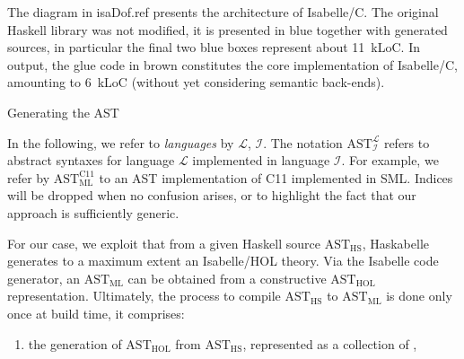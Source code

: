\begin{isabellebody}
\begin{isamarkupfigure*}
\end{isamarkupfigure*}\isamarkuptrue%
%
\begin{isamarkuptext}%
The diagram in \csname isaDof.ref presents the architecture of
Isabelle/C. The original Haskell library was not modified, it is presented in blue together with
generated sources, in particular the final two blue boxes represent about 11~kLoC. In output, the
glue code in brown constitutes the core implementation of Isabelle/C, amounting to 6~kLoC (without
yet considering semantic back-ends).%
\end{isamarkuptext}\isamarkuptrue%
%
\begin{isamarkupsubsection*}%
[label = {arch1},type = {scholarly_paper.technical}, args={label = {arch1},type = {scholarly_paper.technical}, Isa_COL.text_element.level = {}, Isa_COL.text_element.referentiable = {False}, Isa_COL.text_element.variants = {{STR ''outline'', STR ''document''}}, scholarly_paper.text_section.main_author = {}, scholarly_paper.text_section.fixme_list = {}, Isa_COL.text_element.level = {}, scholarly_paper.technical.definition_list = {}}]Generating the AST%
\end{isamarkupsubsection*}\isamarkuptrue%
%
\begin{isamarkuptext}%
In the following, we refer to \emph{languages} by $\mathcal{L}$,
$\mathcal{I}$. The notation $\text{AST}^{\mathcal{L}}_{\mathcal{I}}$ refers to abstract syntaxes for
language $\mathcal{L}$ implemented in language $\mathcal{I}$. For example, we refer by
$\text{AST}^{\text{C11}}_{\text{ML}}$ to an AST implementation of C11 implemented in SML. Indices
will be dropped when no confusion arises, or to highlight the fact that our approach is
sufficiently generic.%
\end{isamarkuptext}\isamarkuptrue%
%
\begin{isamarkuptext}%
For our case, we exploit that from a given Haskell source $\text{AST}_{\text{HS}}$,
Haskabelle generates to a maximum extent an Isabelle/HOL theory. Via the Isabelle code generator, an
$\text{AST}_{\text{ML}}$ can be obtained from a constructive $\text{AST}_{\text{HOL}}$
representation. Ultimately, the process to compile $\text{AST}_{\text{HS}}$ to $\text{AST}_{\text{ML}}$
is done only once at build time, it comprises:

%
\begin{enumerate}%
\item the generation of $\text{AST}_{\text{HOL}}$ from $\text{AST}_{\text{HS}}$, represented as a
collection of ,


\end{enumerate}
\end{isamarkuptext}
\end{isabellebody}
